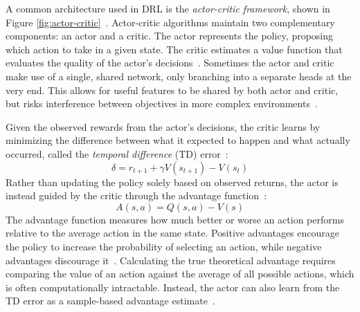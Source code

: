 A common architecture used in DRL is the \textit{actor-critic framework}, shown in Figure \ref{fig:actor-critic}~\cite{barto1983ac,konda1999ac}.
Actor-critic algorithms maintain two complementary components: an actor and a critic.
The actor represents the policy, proposing which action to take in a given state.
The critic estimates a value function that evaluates the quality of the actor's decisions~\cite{barto1983ac,konda1999ac}.
Sometimes the actor and critic make use of a single, shared network, only branching into a separate heads at the very end.
This allows for useful features to be shared by both actor and critic, but risks interference between objectives in more complex environments~\cite{sutton2018rl,konda1999ac}.

Given the observed rewards from the actor's decisions, the critic learns by minimizing the difference between what it expected to happen and what actually occurred, called the \textit{temporal difference} (TD) error~\cite{sutton2018rl,konda1999ac}:
\begin{equation}
    \delta = r_{t+1} + \gamma V(s_{t+1}) - V(s_t)
\end{equation}
Rather than updating the policy solely based on observed returns, the actor is instead guided by the critic through the advantage function~\cite{sutton2018rl}:
\begin{equation}
    A(s, a) = Q(s, a) - V(s)
\end{equation}
The advantage function measures how much better or worse an action performs relative to the average action in the same state.
Positive advantages encourage the policy to increase the probability of selecting an action, while negative advantages discourage it~\cite{sutton2018rl}.
Calculating the true theoretical advantage requires comparing the value of an action against the average of all possible actions, which is often computationally intractable.
Instead, the actor can also learn from the TD error as a sample-based advantage estimate~\cite{sutton2018rl,konda1999ac}.

